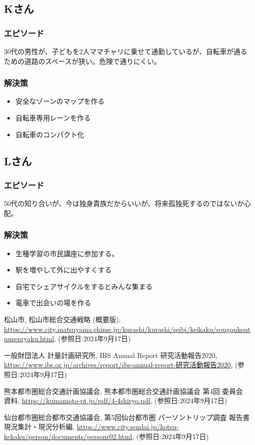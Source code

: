 \documentclass[a4paper,12pt, uplatex]{jsbook}
\begin{document}
\subsection{Kさん}
\subsubsection{エピソード}
30代の男性が、子どもを2人ママチャリに乗せて通勤しているが、自転車が通るための道路のスペースが狭い。危険で通りにくい。

\subsubsection{解決策}
\begin{itemize}
  \item 安全なゾーンのマップを作る
  \item 自転車専用レーンを作る
  \item 自転車のコンパクト化
\end{itemize}


\subsection{Lさん}
\subsubsection{エピソード}
50代の知り合いが、今は独身貴族だからいいが、将来孤独死するのではないか心配。

\subsubsection{解決策}
\begin{itemize}
  \item 生種学習の市民講座に参加する。
  \item 駅を増やして外に出やすくする
  \item 自宅でシェアサイクルをするとみんな集まる
  \item 電車で出会いの場を作る
\end{itemize}



\begin{thebibliography}{9}
 松山市, 松山市総合交通戦略 (概要版), \url{https://www.city.matsuyama.ehime.jp/kurashi/kurashi/seibi/keikaku/sougoukoutuusenryaku.html}, (参照日:2024年9月17日)

 一般財団法人 計量計画研究所, IBS Annual Report 研究活動報告2020, \url{https://www.ibs.or.jp/archives/report/ibs-annual-report-研究活動報告2020}, (参照日:2024年9月17日)

 熊本都市圏総合交通計画協議会, 熊本都市圏総合交通計画協議会 第4回 委員会 資料, \url{https://kumamoto-pt.jp/pdf/4-4shiryo.pdf}, (参照日:2024年9月17日)

 仙台都市圏総合都市交通協議会, 第5回仙台都市圏 パーソントリップ調査 報告書 現況集計・現況分析編, \url{https://www.city.sendai.jp/kotsu-kekaku/person/documents/personr02.html}, (参照日:2024年9月17日)

\end{thebibliography}
\end{document}

